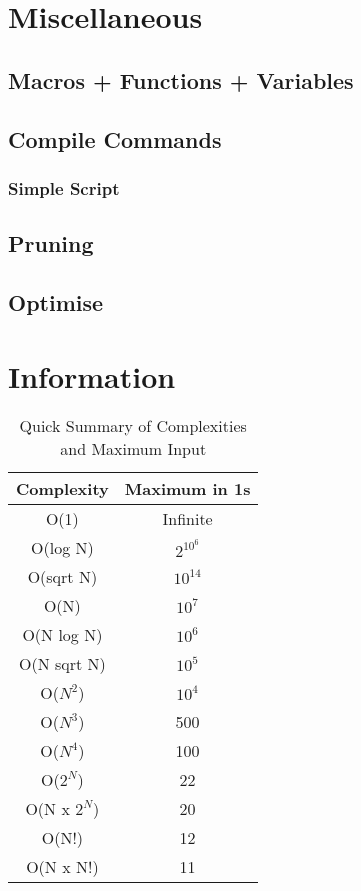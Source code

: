 \documentclass{article}
\begin{document}
\section{Miscellaneous}
\subsection{Macros + Functions + Variables}


\subsection{Compile Commands}

\subsubsection{Simple Script}


\subsection{Pruning}


\subsection{Optimise}


\section{Information}
\begin{table}[H]
\begin{tabular}{|c|c|}
\hline
Complexity     & Maximum in 1s \\ \hline
O(1)           & Infinite      \\ \hline
O(log N)       & $2^{10^{6}}$  \\ \hline
O(sqrt N)      & $10^{14}$     \\ \hline
O(N)           & $10^{7}$      \\ \hline
O(N log N)     & $10^{6}$      \\ \hline
O(N sqrt N)    & $10^{5}$      \\ \hline
O($N^{2}$)     & $10^{4}$      \\ \hline
O($N^{3}$)     & 500           \\ \hline
O($N^{4}$)     & 100           \\ \hline
O($2^{N}$)     & 22            \\ \hline
O(N x $2^{N}$) & 20            \\ \hline
O(N!)          & 12            \\ \hline
O(N x N!)      & 11            \\ \hline
\end{tabular}
\caption{Quick Summary of Complexities and Maximum Input}
\label{tab:complexity}
\end{table}
\end{document}
